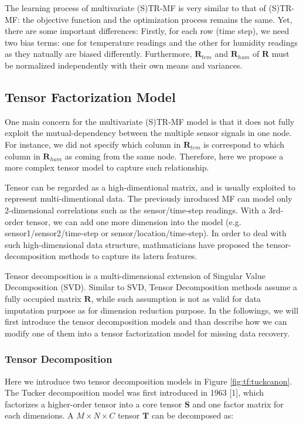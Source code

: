The learning process of multivariate (S)TR-MF is very similar to that of (S)TR-MF: the objective function and the optimization process remains the same. Yet, there are some important differences: 
Firstly, for each row (time step), we need two bias terms: one for temperature readings and the other for humidity readings as they natually are biased differently. Furthermore, $\mathbf{R}_{tem}$ and $\mathbf{R}_{hum}$ of $\mathbf{R}$ must be normalized independently with their own means and variances. 

 
\subsection{Tensor Factorization Model} \label{sec:tensordecomp}

One main concern for the multivariate (S)TR-MF model is that it does not fully exploit the mutual-dependency between the multiple sensor signals in one node. For instance, we did not specify which column in $\mathbf{R}_{tem}$ is correspond to which column in $\mathbf{R}_{hum}$ as coming from the same node. Therefore, here we propose a more complex tensor model to capture such relationship. 

Tensor can be regarded as a high-dimentional matrix, and is usually exploited to represent multi-dimentional data. The previously inroduced MF can model only 2-dimensional correlations such as the sensor/time-step readings. With a 3rd-order tensor, we can add one more dimension into the model (e.g. sensor1/sensor2/time-step or sensor/location/time-step). In order to deal with such high-dimensional data structure, mathmaticians have proposed the tensor-decomposition methods to capture its latern features. 

Tensor decomposition is a multi-dimensional extension of Singular Value Decomposition (SVD). Similar to SVD, Tensor Decomposition methods assume a fully occupied matrix $\mathbf{R}$, while such assumption is not as valid for data imputation purpose as for dimension reduction purpose.
In the followings, we will first introduce the tensor decomposition models and than describe how we can modify one of them into a tensor factorization model for missing data recovery. 

 
\subsubsection{Tensor Decomposition}
Here we introduce two tensor decomposition models in Figure \ref{fig:tf:tuckcanon}. The Tucker decomposition model was first introduced in 1963 [1], which factorizes a higher-order tensor into a core tensor $\mathbf{S}$ and one factor matrix for each dimensions.
A $M\times N \times C $ tensor $\mathbf{T}$ can be decomposed as:

